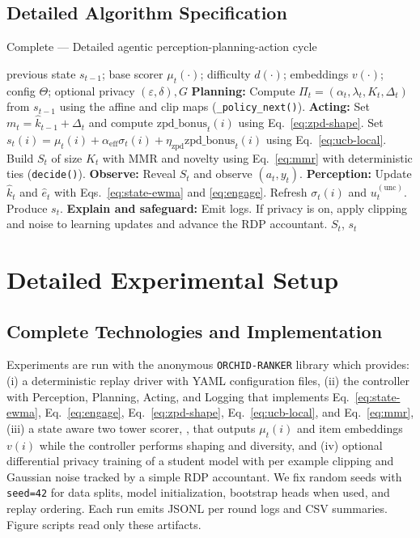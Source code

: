 \subsection{Detailed Algorithm Specification}
\label{app:detailed-algorithm}

\begin{algorithm}[h]
\caption{Complete  — Detailed agentic perception-planning-action cycle}
\label{alg:orchid-detailed}
\begin{algorithmic}[1]
\Require previous state \(s_{t-1}\); base scorer \(\mu_t(\cdot)\); difficulty \(d(\cdot)\); embeddings \(v(\cdot)\); config \(\Theta\); optional privacy \((\varepsilon,\delta), G\)
\State \textbf{Planning:} Compute \(\Pi_t = (\alpha_t, \lambda_t, K_t, \Delta_t)\) from \(s_{t-1}\) using the affine and clip maps ({\footnotesize\texttt{\_policy\_next()}}).
\State \textbf{Acting:}
\State \quad Set \(m_t = \widehat{k}_{t-1} + \Delta_t\) and compute \(\mathrm{zpd\_bonus}_t(i)\) using Eq.~\ref{eq:zpd-shape}.
\State \quad Set \(s_t(i) = \mu_t(i) + \alpha_{\mathrm{eff}}\sigma_t(i) + \eta_{\mathrm{zpd}}\mathrm{zpd\_bonus}_t(i)\) using Eq.~\ref{eq:ucb-local}.
\State \quad Build \(S_t\) of size \(K_t\) with MMR and novelty using Eq.~\ref{eq:mmr} with deterministic ties ({\footnotesize\texttt{decide()}}).
\State \textbf{Observe:} Reveal \(S_t\) and observe \((a_t,y_t)\).
\State \textbf{Perception:} Update \(\widehat{k}_t\) and \(\widehat{e}_t\) with Eqs.~\eqref{eq:state-ewma} and \eqref{eq:engage}. Refresh \(\sigma_t(i)\) and \(u_t^{(\mathrm{unc})}\). Produce \(s_t\).
\State \textbf{Explain and safeguard:} Emit logs. If privacy is on, apply clipping and noise to learning updates and advance the RDP accountant.
\State \Return \(S_t\), \(s_t\)
\end{algorithmic}
\end{algorithm}

\section{Detailed Experimental Setup}
\label{app:detailed-setup}

\subsection{Complete Technologies and Implementation}
Experiments are run with the anonymous \texttt{ORCHID-RANKER} library which provides:
(i) a deterministic replay driver with YAML configuration files,
(ii) the controller with Perception, Planning, Acting, and Logging that implements Eq.~\eqref{eq:state-ewma}, Eq.~\eqref{eq:engage}, Eq.~\eqref{eq:zpd-shape}, Eq.~\eqref{eq:ucb-local}, and Eq.~\eqref{eq:mmr},
(iii) a state aware two tower scorer, \orchidrank{}, that outputs $\mu_t(i)$ and item embeddings $v(i)$ while the controller performs shaping and diversity, and
(iv) optional differential privacy training of a student model with per example clipping and Gaussian noise tracked by a simple RDP accountant.
We fix random seeds with \texttt{seed=42} for data splits, model initialization, bootstrap heads when used, and replay ordering. Each run emits JSONL per round logs and CSV summaries. Figure scripts read only these artifacts.

